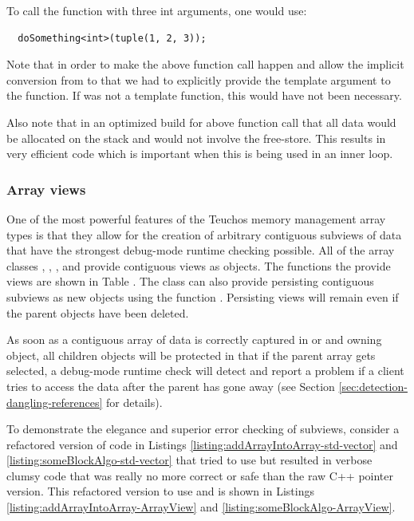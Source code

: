 \documentclass[pdf,ps2pdf,11pt]{SANDreport}
\begin{document}
To call the function with three int arguments, one would use:

{\small\begin{verbatim}
  doSomething<int>(tuple(1, 2, 3));
\end{verbatim}}

Note that in order to make the above function call happen and allow
the implicit conversion from {} to
{} that we had to explicitly provide the
template argument to the {} function.  If
{} was not a template function, this would have
not been necessary.

Also note that in an optimized build for above function call that all
data would be allocated on the stack and would not involve the
free-store.  This results in very efficient code which is important
when this is being used in an inner loop.


%
{}\subsubsection{Array views}
\label{sec:array-views}
%

One of the most powerful features of the Teuchos memory management
array types is that they allow for the creation of arbitrary
contiguous subviews of data that have the strongest debug-mode runtime
checking possible.  All of the array classes {},
{}, {}, and {} provide
contiguous views as {} objects.  The functions the
provide {} views are shown in Table
{}.  The {}
class can also provide persisting contiguous subviews as new
{} objects using the function
{}.  Persisting views will
remain even if the parent {} objects have been deleted.

As soon as a contiguous array of data is correctly captured in
{} or and owning {} object, all
children {} objects will be protected in that if the
parent array gets selected, a debug-mode runtime check will detect and
report a problem if a client tries to access the data after the parent
has gone away (see Section {}\ref{sec:detection-dangling-references}
for details).

To demonstrate the elegance and superior error checking of
{} subviews, consider a refactored version of code
in Listings {}\ref{listing:addArrayIntoArray-std-vector} and
{}\ref{listing:someBlockAlgo-std-vector} that tried to use
{} but resulted in verbose clumsy code that was
really no more correct or safe than the raw C++ pointer version.  This
refactored version to use {} and {} is
shown in Listings {}\ref{listing:addArrayIntoArray-ArrayView} and
{}\ref{listing:someBlockAlgo-ArrayView}.
\end{document}
